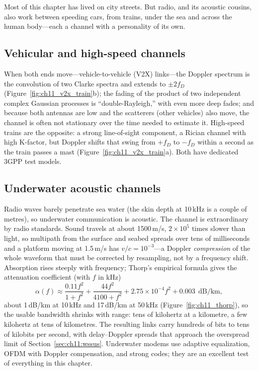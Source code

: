 
Most of this chapter has lived on city streets. But radio, and its acoustic cousins, also work
between speeding cars, from trains, under the sea and across the human body---each a channel
with a personality of its own.

\subsection{Vehicular and high-speed channels}



When both ends move---vehicle-to-vehicle (V2X) links---the Doppler spectrum is the convolution of
two Clarke spectra and extends to $\pm2f_D$ (Figure~\ref{fig:ch11_v2x_train}b); the fading of the
product of two independent complex Gaussian processes is ``double-Rayleigh,'' with even more deep
fades; and because both antennas are low and the scatterers (other vehicles) also move, the channel
is often not stationary over the time needed to estimate it. High-speed trains are the opposite: a
strong line-of-sight component, a Rician channel with high K-factor, but Doppler shifts that swing
from $+f_D$ to $-f_D$ within a second as the train passes a mast (Figure~\ref{fig:ch11_v2x_train}a).
Both have dedicated 3GPP test models.



\subsection{Underwater acoustic channels}

Radio waves barely penetrate sea water (the skin depth at 10\,kHz is a couple of metres), so
underwater communication is acoustic. The channel is extraordinary by radio standards. Sound travels
at about 1500\,m/s, $2\times10^5$ times slower than light, so multipath from the surface and seabed
spreads over tens of milliseconds and a platform moving at 1.5\,m/s has $v/c=10^{-3}$---a Doppler
\emph{compression} of the whole waveform that must be corrected by resampling, not by a frequency
shift. Absorption rises steeply with frequency; Thorp's empirical formula gives the attenuation
coefficient (with $f$ in kHz)
\begin{equation}
\alpha(f)\approx\frac{0.11f^2}{1+f^2}+\frac{44f^2}{4100+f^2}+2.75\times10^{-4}f^2+0.003\ \ \text{dB/km},
\end{equation}
about 1\,dB/km at 10\,kHz and 17\,dB/km at 50\,kHz (Figure~\ref{fig:ch11_thorp}), so the usable
bandwidth shrinks with range: tens of kilohertz at a kilometre, a few kilohertz at tens of
kilometres. The resulting links carry hundreds of bits to tens of kilobits per second, with
delay--Doppler spreads that approach the overspread limit of Section~\ref{sec:ch11:wssus}. Underwater
modems use adaptive equalization, OFDM with Doppler compensation, and strong codes; they are an
excellent test of everything in this chapter.

